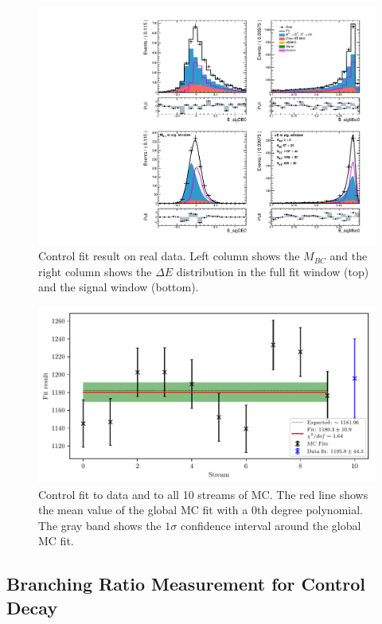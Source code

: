 \begin{figure}[!htbp]
	\centering
	\captionsetup{width=0.8\linewidth}
	\includegraphics[width=\linewidth]{fig/cs_fit_data}
	\caption{Control fit result on real data. Left column shows the $M_{BC}$ and the right column shows the $\Delta E$ distribution in the full fit window (top) and the signal window (bottom).}
	\label{fig:cs_fit_data}
\end{figure}

\begin{figure}[!htbp]
	\centering
	\captionsetup{width=0.8\linewidth}
	\includegraphics[width=\linewidth]{fig/cs_global}
	\caption{Control fit to data and to all 10 streams of MC. The red line shows the mean value of the global MC fit with a 0th degree polynomial. The gray band shows the $1\sigma$ confidence interval around the global MC fit.}
	\label{fig:cs_global}
\end{figure}


\subsection{Branching Ratio Measurement for Control Decay}

